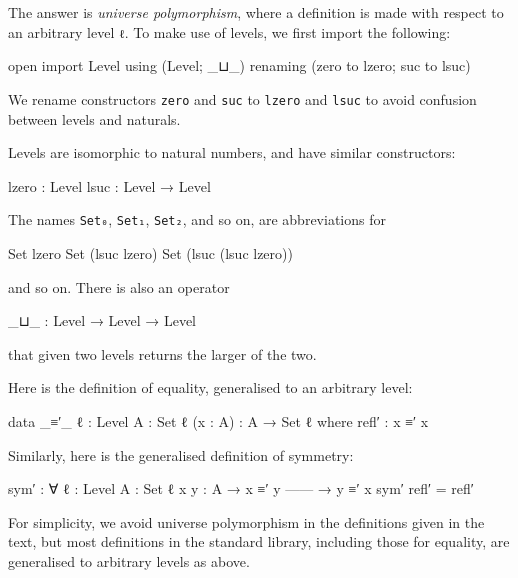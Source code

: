 The answer is \emph{universe polymorphism}, where a definition is made
with respect to an arbitrary level \texttt{ℓ}. To make use of levels, we
first import the following:

\begin{fence}
\begin{code}
open import Level using (Level; _⊔_) renaming (zero to lzero; suc to lsuc)
\end{code}
\end{fence}

We rename constructors \texttt{zero} and \texttt{suc} to \texttt{lzero}
and \texttt{lsuc} to avoid confusion between levels and naturals.

Levels are isomorphic to natural numbers, and have similar constructors:

\begin{myDisplay}
lzero : Level
lsuc  : Level → Level
\end{myDisplay}

The names \texttt{Set₀}, \texttt{Set₁}, \texttt{Set₂}, and so on, are
abbreviations for

\begin{myDisplay}
Set lzero
Set (lsuc lzero)
Set (lsuc (lsuc lzero))
\end{myDisplay}

and so on. There is also an operator

\begin{myDisplay}
_⊔_ : Level → Level → Level
\end{myDisplay}

that given two levels returns the larger of the two.

Here is the definition of equality, generalised to an arbitrary level:

\begin{fence}
\begin{code}
data _≡′_ {ℓ : Level} {A : Set ℓ} (x : A) : A → Set ℓ where
  refl′ : x ≡′ x
\end{code}
\end{fence}

Similarly, here is the generalised definition of symmetry:

\begin{fence}
\begin{code}
sym′ : ∀ {ℓ : Level} {A : Set ℓ} {x y : A}
  → x ≡′ y
    ------
  → y ≡′ x
sym′ refl′ = refl′
\end{code}
\end{fence}

For simplicity, we avoid universe polymorphism in the definitions given
in the text, but most definitions in the standard library, including
those for equality, are generalised to arbitrary levels as above.

